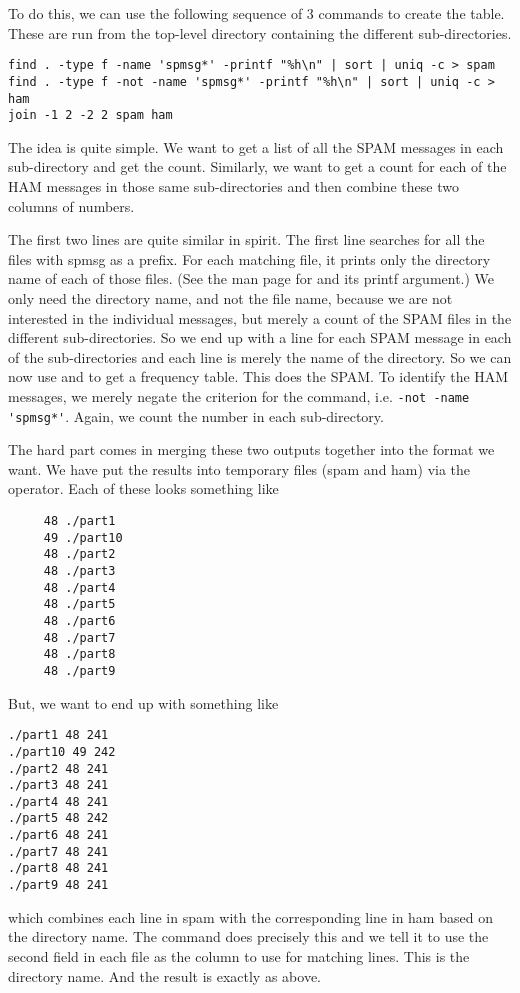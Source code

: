 \begin{comment}
\begin{verbatim}
for i in part* ; do cd $i; echo "$i `ls -1 spmsg* | wc -l`  `find . -not -name 'spmsg*' | wc -l`" ; cd .. ; done
\end{verbatim}
\end{comment}

To do this, we can use the following sequence of 3 commands
to create the table.
These are run from the top-level directory containing the
different  sub-directories.
\begin{verbatim}
find . -type f -name 'spmsg*' -printf "%h\n" | sort | uniq -c > spam
find . -type f -not -name 'spmsg*' -printf "%h\n" | sort | uniq -c > ham
join -1 2 -2 2 spam ham
\end{verbatim}
The idea is quite simple. We want to get a list of
all the SPAM messages in each sub-directory
and get the count.
Similarly, we want to get a count for each of the HAM
messages in those same sub-directories and then
combine these two columns of numbers.

The first two lines are quite similar in spirit.
The first line searches for all the files with  spmsg
as a prefix.  For each matching file, it prints only the directory name
of each of those files. (See the man page for  and its
printf argument.)
We only need the directory name, and not the file name,
because we are not interested in the individual
messages, but merely a count of the SPAM files in the different
sub-directories. So we end up with a line for each SPAM message in
each of the sub-directories and each line is merely the name of the
directory. So we can now use  and 
to get a frequency table.
This does the SPAM. To identify the HAM messages, we merely negate the
criterion for the  command, i.e. \verb+-not -name 'spmsg*'+.
Again, we count the number in each sub-directory.

The hard part comes in merging these two outputs together into
the format we want.  We have put the results into temporary
files (spam and ham) via the $\>$ operator.
Each of these looks something like
\begin{verbatim}
     48 ./part1
     49 ./part10
     48 ./part2
     48 ./part3
     48 ./part4
     48 ./part5
     48 ./part6
     48 ./part7
     48 ./part8
     48 ./part9
\end{verbatim}
But, we want to end up with something like
\begin{verbatim}
./part1 48 241
./part10 49 242
./part2 48 241
./part3 48 241
./part4 48 241
./part5 48 242
./part6 48 241
./part7 48 241
./part8 48 241
./part9 48 241
\end{verbatim}
which combines each line in spam with the corresponding line in ham
based on the directory name. 
The  command does precisely this 
and we tell it to use the second field in each file
as the column to use for matching lines. This is the
directory name.  And the result is exactly as above.





